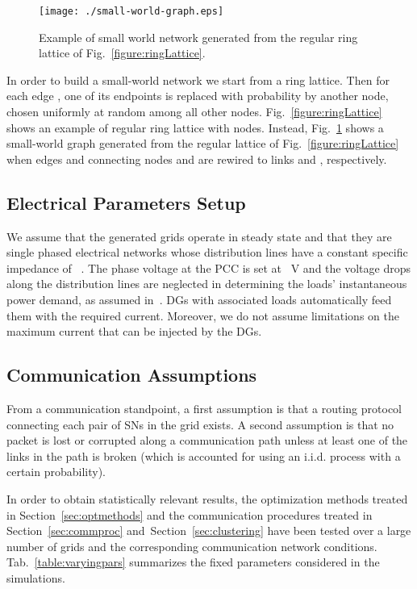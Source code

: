 \documentclass[journal]{IEEEtran}
\newcommand{\fig}[1]{Fig.~\ref{#1}}
\newcommand{\tab}[1]{Tab.~\ref{#1}}
\newcommand{\secref}[1]{Section~\ref{#1}}
\begin{document}
\begin{figure}
\centering
\texttt{[image: ./small-world-graph.eps]}
\caption{Example of small world network generated from the regular ring lattice of \fig{figure:ringLattice}.\label{figure:smallworld}}
\end{figure}

In order to build a small-world network we start from a ring lattice. Then for each edge , one of its endpoints is replaced with probability  by another node, chosen uniformly at random among all other nodes. \fig{figure:ringLattice} shows an example of regular ring lattice with  nodes. Instead, \fig{figure:smallworld} shows a small-world graph generated from the regular lattice of \fig{figure:ringLattice} when edges  and  connecting nodes  and  are rewired to links  and , respectively.

\subsection{Electrical Parameters Setup}
\label{ssec:parameters}

We assume that the generated grids operate in steady state and that they are single phased electrical networks whose distribution lines have a constant specific impedance of ~. The phase voltage at the PCC is set at ~V and the voltage drops along the distribution lines are neglected in determining the loads' instantaneous power demand, as assumed in~\cite{SurroundControl}. DGs with associated loads  automatically feed them with the required current. Moreover, we do not assume limitations on the maximum current that can be injected by the DGs.

\subsection{Communication Assumptions}

\label{ssec:commassumptions}
From a communication standpoint, a first assumption is that a routing protocol connecting each pair of SNs in the grid exists. A second assumption is that no packet is lost or corrupted along a communication path unless at least one of the links in the path is broken (which is accounted for using an i.i.d. process with a certain probability).

\label{ssec:statgeneration}
In order to obtain statistically relevant results, the optimization methods treated in \secref{sec:optmethods} and the communication procedures treated in \secref{sec:commproc} and~\secref{sec:clustering} have been tested over a large number of grids and the corresponding communication network conditions. \tab{table:varyingpars} summarizes the fixed parameters considered in the simulations.
\end{document}
